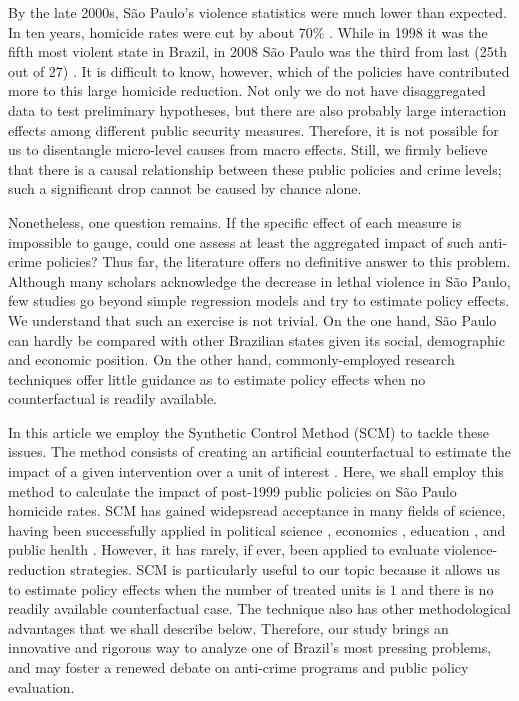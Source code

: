 \documentclass[a4paper,11pt]{article}
\begin{document}
By the late 2000s, S\~{a}o Paulo's violence statistics were much lower than expected. In ten years, homicide rates were cut by about 70\% \citep{feltran2012}. While in 1998 it was the fifth most violent state in Brazil, in 2008 S\~{a}o Paulo was the third from last (25th out of 27) \citep{mapa2011}. It is difficult to know, however, which of the policies have contributed more to this large homicide reduction. Not only we do not have disaggregated data to test preliminary hypotheses, but there are also probably large interaction effects among different public security measures. Therefore, it is not possible for us to disentangle micro-level causes from macro effects. Still, we firmly believe that there is a causal relationship between these public policies and crime levels; such a significant drop cannot be caused by chance alone. 

Nonetheless, one question remains. If the specific effect of each measure is impossible to gauge, could one assess at least the aggregated impact of such anti-crime policies? Thus far, the literature offers no definitive answer to this problem. Although many scholars acknowledge the decrease in lethal violence in S\~{a}o Paulo, few studies go beyond simple regression models and try to estimate policy effects. We understand that such an exercise is not trivial. On the one hand, S\~{a}o Paulo can hardly be compared with other Brazilian states given its social, demographic and economic position. On the other hand, commonly-employed research techniques offer little guidance as to estimate policy effects when no counterfactual is readily available. 

In this article we employ the Synthetic Control Method (SCM) to tackle these issues. The method consists of creating an artificial counterfactual to estimate the impact of a given intervention over a unit of interest \citep{abadie2003, abadie2010, abadie2011}. Here, we shall employ this method to calculate the impact of post-1999 public policies on S\~{a}o Paulo homicide rates. SCM has gained widepsread acceptance in many fields of science, having been successfully applied in political science \citep{abadie2014, montalvo2011}, economics \citep{billmeier2013, coffman2012, jinjarak2013}, education \citep{hinrichs2012}, and public health \citep{heim2014}. However, it has rarely, if ever, been applied to evaluate violence-reduction strategies. SCM is particularly useful to our topic because it allows us to estimate policy effects when the number of treated units is $1$ and there is no readily available counterfactual case. The technique also has other methodological advantages that we shall describe below. Therefore, our study brings an innovative and rigorous way to analyze one of Brazil's most pressing problems, and may foster a renewed debate on anti-crime programs and public policy evaluation.
\end{document}
